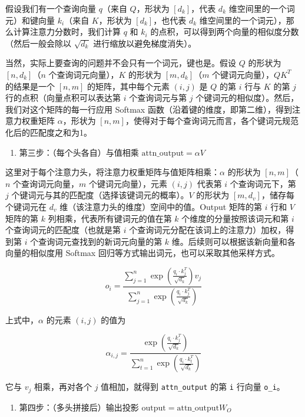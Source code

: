 假设我们有一个查询向量 \(q\)（来自 \(Q\)，形状为 \([d_k]\)，代表 \(d_k\) 维空间里的一个词元）和键向量 \(k_i\)（来自 \(K\)，形状为 \([d_k]\)，也代表 \(d_k\) 维空间里的一个词元），那么计算注意力分数时，我们计算 \(q\) 和 \(k_i\) 的点积，可以得到两个向量的相似度分数（然后一般会除以 \(\sqrt{d_k}\) 进行缩放以避免梯度消失）。

当然，实际上要查询的问题并不会只有一个词元，键也是。假设 \(Q\) 的形状为 \([n,d_k]\)（\(n\) 个查询词元向量），\(K\) 的形状为 \([m,d_k]\)（\(m\) 个键词元向量），\(QK^T\) 的结果是一个 \([n,m]\) 的矩阵，其中每个元素 \((i,j)\) 是 \(Q\) 的第 \(i\) 行与 \(K\) 的第 \(j\) 行的点积（向量点积可以表达第 \(i\) 个查询词元与第 \(j\) 个键词元的相似度）。然后，我们对这个矩阵的每一行应用 Softmax 函数（沿着键的维度，即第二维），得到注意力权重矩阵 \(\alpha\)，形状为 \([n,m]\)，使得对于每个查询词元而言，各个键词元规范化后的匹配度之和为1。

\begin{enumerate}
\def\labelenumi{\arabic{enumi}.}
\setcounter{enumi}{2}
\tightlist
\item
  第三步：（每个头各自）与值相乘 \(\mathrm{attn\_output}=\alpha V\)
\end{enumerate}

这里对于每个注意力头，将注意力权重矩阵与值矩阵相乘：\(\alpha\) 的形状为 \([n,m]\)（\(n\) 个查询词元向量，\(m\) 个键词元向量），元素 \((i,j)\) 代表第 \(i\) 个查询词元下，第 \(j\) 个键词元与其的匹配度（选择该键词元的概率）。\(V\) 的形状为 \([m,d_v]\)，储存每个键词元在 \(d_v\) 维（该注意力头的维度）空间中的值。Output 矩阵的第 \(i\) 行和 \(V\) 矩阵的第 \(k\) 列相乘，代表所有键词元的值在第 \(k\) 个维度的分量按照该词元和第 \(i\) 个查询词元的匹配度（也就是第 \(i\) 个查询词元分配在该词上的注意力）加权，得到第 \(i\) 个查询词元查找到的新词元向量的第 \(k\) 维。后续则可以根据该新向量和各向量的相似度用 Softmax 回归等方式输出词元，也可以采取其他采样方式。

\[
o_i = \frac{\sum_{j=1}^{n} \exp\left(\frac{q_i \cdot k_j^T}{\sqrt{d_k}}\right) v_j}{\sum_{j=1}^{n} \exp\left(\frac{q_i \cdot k_j^T}{\sqrt{d_k}}\right)}
\]

上式中，\(\alpha\) 的元素 \((i,j)\) 的值为

\[
\alpha_{i,j} = \frac{\exp\left(\frac{q_i \cdot k_j^T}{\sqrt{d_k}}\right)}{\sum_{t=1}^{n} \exp\left(\frac{q_i \cdot k_t^T}{\sqrt{d_k}}\right)}
\]

它与 \(v_j\) 相乘，再对各个 \(j\) 值相加，就得到 \texttt{attn\_output} 的第 \texttt{i} 行向量 \texttt{o\_i}。

\begin{enumerate}
\def\labelenumi{\arabic{enumi}.}
\setcounter{enumi}{3}
\tightlist
\item
  第四步：（多头拼接后）输出投影 \(\mathrm{output}=\mathrm{attn\_output}W_O\)
\end{enumerate}

